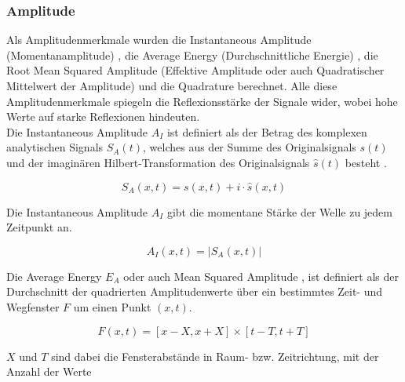 \subsubsection{Amplitude}

Als Amplitudenmerkmale wurden die Instantaneous Amplitude (Momentanamplitude) \parencite{taner_complex_1979}, die Average Energy (Durchschnittliche Energie) \parencites{roden_geologic_2015}{seg_wiki_average_2021}, die Root Mean Squared Amplitude (Effektive Amplitude oder auch Quadratischer Mittelwert der Amplitude) \parencites{roden_geologic_2015}{seg_wiki_rms_2022} und die Quadrature \parencites{taner_complex_1979}{seg_wiki_complex-trace_2024} berechnet. Alle diese Amplitudenmerkmale spiegeln die Reflexionsstärke der Signale wider, wobei hohe Werte auf starke Reflexionen hindeuten. \\
Die Instantaneous Amplitude $A_I$ \parencite[S. 191]{sheriff_encyclopedic_2002} ist definiert als der Betrag des komplexen analytischen Signals $S_A(t)$, welches aus der Summe des Originalsignals $s(t)$ und der imaginären Hilbert-Transformation des Originalsignals $\hat{s}(t)$ besteht \parencite[S. 177]{sheriff_encyclopedic_2002}. 

\begin{equation}
    S_A(x,t) = s(x,t) + i \cdot \hat{s}(x,t)
\end{equation}

\noindent Die Instantaneous Amplitude $A_I$ gibt die momentane Stärke der Welle zu jedem Zeitpunkt an.

\begin{equation}
    A_I(x,t) = |S_A(x,t)|
\end{equation}

\noindent Die Average Energy $E_A$ oder auch Mean Squared Amplitude \parencite{seg_wiki_average_2021}, ist definiert als der Durchschnitt der quadrierten Amplitudenwerte über ein bestimmtes Zeit- und Wegfenster $F$ um einen Punkt $(x,t)$.

\begin{equation}
	F(x,t) = [x - X, x + X] \times [t - T, t + T]
	\label{eq:window_function}
\end{equation}

\noindent $X$ und $T$ sind dabei die Fensterabstände in Raum- bzw. Zeitrichtung, mit der Anzahl der Werte

